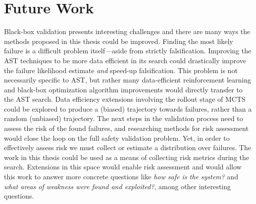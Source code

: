 \section{Future Work}
Black-box validation presents interesting challenges and there are many ways the methods proposed in this thesis could be improved.
Finding the most likely failure is a difficult problem itself---aside from strictly falsification.
Improving the AST techniques to be more data efficient in its search could drastically improve the failure likelihood estimate \textit{and} speed-up falsification.
This problem is not necessarily specific to AST, but rather many data-efficient reinforcement learning and black-box optimization algorithm improvements would directly transfer to the AST search.
Data efficiency extensions involving the rollout stage of MCTS could be explored to produce a (biased) trajectory towards failures, rather than a random (unbiased) trajectory.
The next steps in the validation process need to assess the risk of the found failures, and researching methods for risk assessment would close the loop on the full safety validation problem.
Yet, in order to effectively assess risk we must collect or estimate a distribution over failures.
The work in this thesis could be used as a means of collecting risk metrics during the search.
Extensions in this space would enable risk assessment and would allow this work to answer more concrete questions like \textit{how safe is the system?} and \textit{what areas of weakness were found and exploited?}, among other interesting questions.
